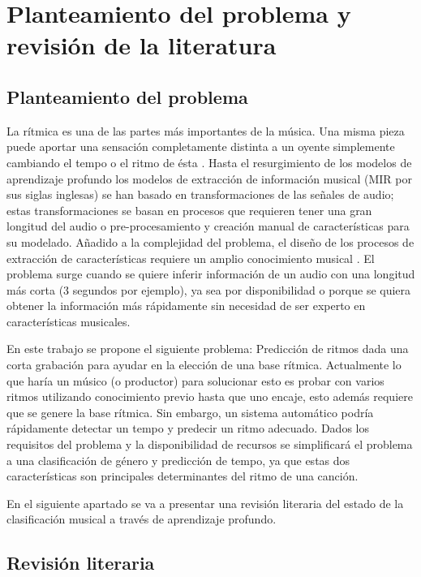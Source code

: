 \chapter{Planteamiento del problema y revisión de la literatura}\label{Chapter:Introduccion}

\section{Planteamiento del problema}\label{sec:planteamiento}

\noindent La rítmica es una de las partes más importantes de la música. Una misma pieza puede aportar una sensación completamente distinta a un oyente simplemente cambiando el tempo o el ritmo de ésta  \cite{DBLP:journals/corr/abs-1804-08167}. Hasta el resurgimiento de los modelos de aprendizaje profundo los modelos de extracción de información musical (MIR por sus siglas inglesas) se han basado en transformaciones de las señales de audio; estas transformaciones se basan en procesos que requieren tener una gran longitud del audio o pre-procesamiento y creación manual de características para su modelado. Añadido a la complejidad del problema, el diseño de los procesos de extracción de características requiere un amplio conocimiento musical \cite{humphrey:2012}. El problema surge cuando se quiere inferir información de un audio con una longitud más corta (3 segundos por ejemplo), ya sea por disponibilidad o porque se quiera obtener la información más rápidamente sin necesidad de ser experto en características musicales.

En este trabajo se propone el siguiente problema: Predicción de ritmos dada una corta grabación para ayudar en la elección de una base rítmica. Actualmente lo que haría un músico (o productor) para solucionar esto es probar con varios ritmos utilizando conocimiento previo hasta que uno encaje, esto además requiere que se genere la base rítmica. Sin embargo, un sistema automático podría rápidamente detectar un tempo y predecir un ritmo adecuado. Dados los requisitos del problema y la disponibilidad de recursos se simplificará el problema a una clasificación de género y predicción de tempo, ya que estas dos características son principales determinantes del ritmo de  una canción. 

En el siguiente apartado se va a presentar una revisión literaria del estado de la clasificación musical a través de aprendizaje profundo.

\section{Revisión literaria}\label{sec:revision}

